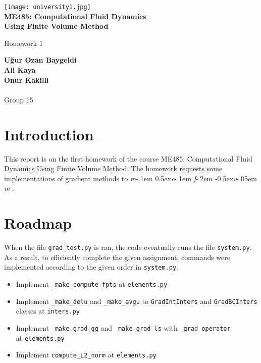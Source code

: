 \documentclass[a4paper, 12pt]{article}
\newcommand\mefvm{%
    \textit{m}\kern-.1em%
    \raise0.5ex\hbox{\textit{e}}\kern-.1em%
    \textit{f}\kern-.2em%
    \raise-0.5ex\hbox{\textit{v}}\kern-.05em%
    \textit{m}
}
\begin{document}
\doublespacing
\begin{titlepage}
    \begin{center}
        \texttt{[image: university1.jpg]}\\
        
        \textbf{ME485: Computational Fluid Dynamics \\ Using Finite Volume Method}

        \vspace{0.5cm}
        Homework 1
            
        \vspace{1.5cm}

        \textbf{Uğur Ozan Baygeldi}\\
        \textbf{Ali Kaya}\\ 
        \textbf{Onur Kakilli}\\~\\
        Group 15
        
    \end{center}
\end{titlepage}

\section{Introduction}

This report is on the first homework of the course ME485, Computational Fluid Dynamics Using Finite Volume Method. The homework requests some implementations of gradient methods to \mefvm\!.

\section{Roadmap}

When the file \verb|grad_test.py| is ran, the code eventually runs the file \verb|system.py|. As a result, to efficiently complete the given assignment, commands were implemented according to the given order in \verb|system.py|.

\begin{itemize}
    \item Implement \verb|_make_compute_fpts| at \verb|elements.py|
    \item Implement \verb|_make_delu| and \verb|_make_avgu| to \verb|GradIntInters| and \verb|GradBCInters| classes at \verb|inters.py|
    \item Implement \verb|_make_grad_gg| and \verb|_make_grad_ls| with \verb|_grad_operator| \\at \verb|elements.py|
    \item Implement \verb|compute_L2_norm| at \verb|elements.py|
\end{itemize}\par
\end{document}
